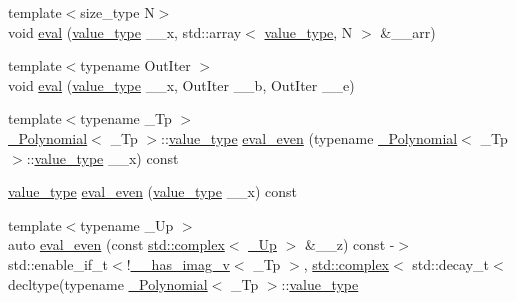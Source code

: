 \begin{DoxyCompactItemize}
\item 
{\footnotesize template$<$size\+\_\+type N$>$ }\\void \hyperlink{class____gnu__cxx_1_1__Polynomial_a3c3b539828301eef5385bc5b230a844a}{eval} (\hyperlink{class____gnu__cxx_1_1__Polynomial_a725563351f50e76084a7a016c06f8a53}{value\+\_\+type} \+\_\+\+\_\+x, std\+::array$<$ \hyperlink{class____gnu__cxx_1_1__Polynomial_a725563351f50e76084a7a016c06f8a53}{value\+\_\+type}, N $>$ \&\+\_\+\+\_\+arr)
\item 
{\footnotesize template$<$typename Out\+Iter $>$ }\\void \hyperlink{class____gnu__cxx_1_1__Polynomial_a409ca632845c145fcf08f8c3e8eeae63}{eval} (\hyperlink{class____gnu__cxx_1_1__Polynomial_a725563351f50e76084a7a016c06f8a53}{value\+\_\+type} \+\_\+\+\_\+x, Out\+Iter \+\_\+\+\_\+b, Out\+Iter \+\_\+\+\_\+e)
\item 
{\footnotesize template$<$typename \+\_\+\+Tp $>$ }\\\hyperlink{class____gnu__cxx_1_1__Polynomial}{\+\_\+\+Polynomial}$<$ \+\_\+\+Tp $>$\+::\hyperlink{class____gnu__cxx_1_1__Polynomial_a725563351f50e76084a7a016c06f8a53}{value\+\_\+type} \hyperlink{class____gnu__cxx_1_1__Polynomial_a5e3d2496522f241c6fae41d222819a59}{eval\+\_\+even} (typename \hyperlink{class____gnu__cxx_1_1__Polynomial}{\+\_\+\+Polynomial}$<$ \+\_\+\+Tp $>$\+::\hyperlink{class____gnu__cxx_1_1__Polynomial_a725563351f50e76084a7a016c06f8a53}{value\+\_\+type} \+\_\+\+\_\+x) const
\item 
\hyperlink{class____gnu__cxx_1_1__Polynomial_a725563351f50e76084a7a016c06f8a53}{value\+\_\+type} \hyperlink{class____gnu__cxx_1_1__Polynomial_ac70ecc3968e15077ef2d68390d150f5a}{eval\+\_\+even} (\hyperlink{class____gnu__cxx_1_1__Polynomial_a725563351f50e76084a7a016c06f8a53}{value\+\_\+type} \+\_\+\+\_\+x) const
\item 
{\footnotesize template$<$typename \+\_\+\+Up $>$ }\\auto \hyperlink{class____gnu__cxx_1_1__Polynomial_a7314653c50b311781a26ac74789d84a1}{eval\+\_\+even} (const \hyperlink{classstd_1_1complex}{std\+::complex}$<$ \hyperlink{class____gnu__cxx_1_1__Polynomial_a242114d4b86648a5dff67a8221f80d40}{\+\_\+\+Up} $>$ \&\+\_\+\+\_\+z) const -\/$>$ std\+::enable\+\_\+if\+\_\+t$<$!\hyperlink{namespace____gnu__cxx_afa2404a914b06f950f3a46e75aca51a9}{\+\_\+\+\_\+has\+\_\+imag\+\_\+v}$<$ \+\_\+\+Tp $>$, \hyperlink{classstd_1_1complex}{std\+::complex}$<$ std\+::decay\+\_\+t$<$ decltype(typename \hyperlink{class____gnu__cxx_1_1__Polynomial}{\+\_\+\+Polynomial}$<$ \+\_\+\+Tp $>$\+::\hyperlink{class____gnu__cxx_1_1__Polynomial_a725563351f50e76084a7a016c06f8a53}{value\+\_\+type}

\end{DoxyCompactItemize}
